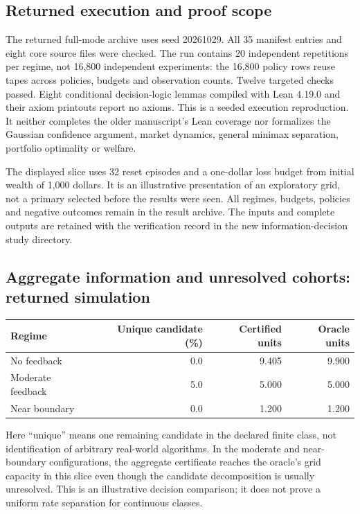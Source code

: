 \subsection*{Returned execution and proof scope}
The returned full-mode archive uses seed 20261029. All 35 manifest entries and
eight core source files were checked. The run contains 20 independent
repetitions per regime, not 16,800 independent experiments: the 16,800 policy
rows reuse tapes across policies, budgets and observation counts. Twelve
targeted checks passed. Eight conditional decision-logic lemmas compiled with
Lean 4.19.0 and their axiom printouts report no axioms. This is a seeded
execution reproduction. It neither completes the older manuscript's Lean
coverage nor formalizes the Gaussian confidence argument, market dynamics,
general minimax separation, portfolio optimality or welfare.

The displayed slice uses 32 reset episodes and a one-dollar loss budget from
initial wealth of 1,000 dollars. It is an illustrative presentation of an
exploratory grid, not a primary selected before the results were seen. All
regimes, budgets, policies and negative outcomes remain in the result archive.
The inputs and complete outputs are retained with the verification record in
the new information-decision study directory.

\subsection*{Aggregate information and unresolved cohorts: returned simulation}
\begin{center}\small
\begin{tabular}{lrrr}
\toprule
Regime & Unique candidate (\%) & Certified units & Oracle units\\
\midrule
No feedback & 0.0 & 9.405 & 9.900\\
Moderate feedback & 5.0 & 5.000 & 5.000\\
Near boundary & 0.0 & 1.200 & 1.200\\
\bottomrule
\end{tabular}
\end{center}
Here ``unique'' means one remaining candidate in the declared finite class,
not identification of arbitrary real-world algorithms. In the moderate and
near-boundary configurations, the aggregate certificate reaches the oracle's
grid capacity in this slice even though the candidate decomposition is usually
unresolved. This is an illustrative decision comparison; it does not prove a
uniform rate separation for continuous classes.

